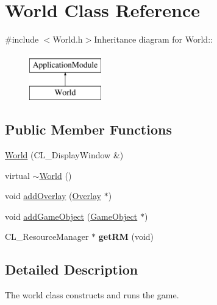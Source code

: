 \hypertarget{classWorld}{
\section{World Class Reference}
\label{classWorld}
}


{\ttfamily \#include $<$World.h$>$}Inheritance diagram for World::\begin{figure}[H]
\begin{center}
\leavevmode
\includegraphics[height=2cm]{classWorld}
\end{center}
\end{figure}
\subsection*{Public Member Functions}
\begin{DoxyCompactItemize}
\item 
\hyperlink{classWorld_a6ce0c6ba5ce813c0ec0b910a88e09d64}{World} (CL\_\-DisplayWindow \&)
\item 
virtual \hyperlink{classWorld_a8c73fba541a5817fff65147ba47cd827}{$\sim$World} ()
\item 
void \hyperlink{classWorld_a6703e4f889e72198e0ede0cd23864792}{addOverlay} (\hyperlink{classOverlay}{Overlay} $\ast$)
\item 
void \hyperlink{classWorld_ad74a2b078f0173249b04e3da2982d081}{addGameObject} (\hyperlink{classGameObject}{GameObject} $\ast$)
\item 
\hypertarget{classWorld_ae62ed957ab6a1c8ffd58b5eeda690ce9}{
CL\_\-ResourceManager $\ast$ {\bfseries getRM} (void)}
\label{classWorld_ae62ed957ab6a1c8ffd58b5eeda690ce9}

\end{DoxyCompactItemize}


\subsection{Detailed Description}
The world class constructs and runs the game. 

